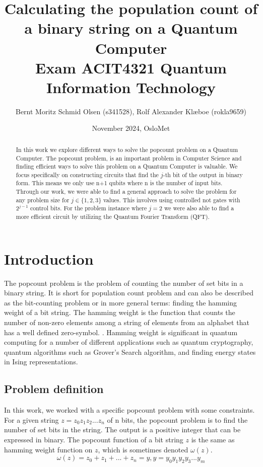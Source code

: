 \documentclass[12pt,a4paper]{article}
\title{%
    Calculating the population count of a binary string on a Quantum Computer \\
    \large Exam ACIT4321 Quantum Information Technology\\
    }
\author{Bernt Moritz Schmid Olsen (s341528), Rolf Alexander Klæboe (rokla9659)}
\date{November 2024, OsloMet}
\begin{document}
\maketitle
\begin{abstract}
    In this work we explore different ways to solve the popcount problem on a Quantum Computer. The popcount problem, is an important problem in Computer Science and finding efficient ways to solve this problem on a Quantum Computer is valuable. We focus specifically on constructing circuits that find the \(j\)-th bit of the output in binary form. This means we only use n+1 qubits where n is the number of input bits. Through our work, we were able to find a general approach to solve the problem for any problem size for \(j \in \{1, 2, 3\}\) values. This involves using controlled not gates with \(2^{j-1}\) control bits. For the problem instance where \(j=2\) we were also able to find a more efficient circuit by utilizing the Quantum Fourier Transform (QFT).
\end{abstract}
\newpage
{
    \hypersetup{linkcolor=black}
    \tableofcontents
}

\section{Introduction}
The popcount problem is the problem of counting the number of set bits in a binary string. It is short for population count problem and can also be described as the bit-counting problem \cite{El_Qawasmeh} or in more general terms: finding the hamming weight of a bit string. The hamming weight is the function that counts the number of non-zero elements among a string of elements from an alphabet that has a well defined zero-symbol. \cite{HAMMING2012345}. Hamming weight is significant in quantum computing for a number of different applications such as quantum cryptography, quantum algorithms such as Grover's Search algorithm\cite{10.1145/237814.237866}, and finding energy states in Ising representations.

\subsection{Problem definition}
In this work, we worked with a specific popcount problem with some constraints. For a given string \(z = z_0 z_1 z_2 ... z_n\) of n bits, the popcount problem is to find the number of set bits in the string. The output is a positive integer that can be expressed in binary. The popcount function of a bit string \(z\) is the same as hamming weight function on \(z\), which is sometimes denoted \(\omega(z)\). 
\[
\omega(z) = z_0 + z_1 + ... + z_n = y, y = y_0y_1y_2y_3 ... y_m
\]
\end{document}
